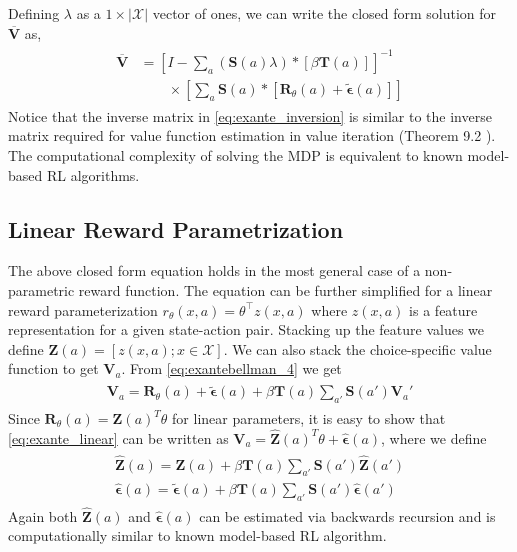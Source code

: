 \documentclass{article}
\begin{document}
Defining $\lambda$ as a $1\times|\mathcal{X}|$ vector of ones, we can write the closed form solution for $\overline{\mathbf{V}}$ as,
\begin{align} \label{eq:exante_inversion}
\begin{split}
\overline{\mathbf{V}} &=\left[I-\sum_{a}(\mathbf{S}(a) \lambda) *\left[ \beta \mathbf{T}(a)  \right]\right]^{-1} \\
& \qquad \times \left[\sum_{a}\mathbf{S}(a) *\left[ \mathbf{R}_{\theta}(a)+\tilde{\bm{\epsilon}}(a)\right]\right]
\end{split}
\end{align}
Notice that the inverse matrix in \eqref{eq:exante_inversion} is similar to the inverse matrix required for value function estimation in value iteration (Theorem 9.2 \cite{ziebart_phd}). The computational complexity of solving the MDP is equivalent to known model-based RL algorithms.


\subsection{Linear Reward Parametrization}

The above closed form equation holds in the most general case of a non-parametric reward function. The equation can be further simplified for a linear reward parameterization $r_{\theta}(x,a) = \theta^{\top} z(x,a) $ where $z(x, a)$ is a feature representation for a given state-action pair. Stacking up the feature values we define $\mathbf{Z}(a) = [z(x, a); x \in \mathcal{X}]$. We can also stack the choice-specific value function to get $\mathbf{V}_a$. From \eqref{eq:exantebellman_4} we get
\begin{align} \label{eq:exante_linear}
    \begin{split}
    \mathbf{V}_a=\mathbf{R}_{\theta}(a)+\tilde{\bm{\epsilon}}(a)+\beta \mathbf{T}(a) \sum_{a'}\mathbf{S}(a')\mathbf{V}_a'
    \end{split}
\end{align}
Since $\mathbf{R}_{\theta}(a) = \mathbf{Z}(a)^T\theta$ for linear parameters, it is easy to show that \eqref{eq:exante_linear} can be written as $\mathbf{V}_a = \hat{\mathbf{Z}}(a)^T\theta + \hat{\bm{\epsilon}}(a)$, where we define
\begin{align} \label{eq:choice_specific_Z_tilde}
\begin{split}
    \hat{\mathbf{Z}}(a) = \mathbf{Z}(a) + \beta\mathbf{T}(a)\sum_{a'}\mathbf{S}(a')\hat{\mathbf{Z}}(a') \\
    \hat{\bm{\epsilon}}(a) = \tilde{\bm{\epsilon}}(a) + \beta\mathbf{T}(a)\sum_{a'}\mathbf{S}(a')\hat{\bm{\epsilon}}(a')
\end{split}    
\end{align}
Again both $\hat{\mathbf{Z}}(a)$ and $\hat{\bm{\epsilon}}(a)$ can be estimated via backwards recursion and is computationally similar to known model-based RL algorithm.
\end{document}
